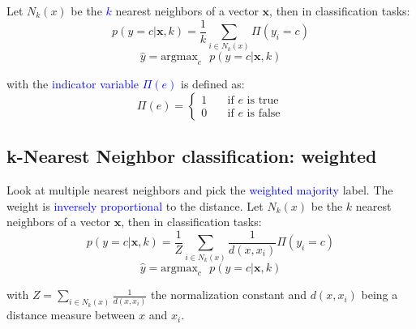 \documentclass[a4paper,10pt,twoside=true,DIV=10,headsepline,plainheadsepline]{scrartcl}
\begin{document}
Let $N_k (x)$ be the \textcolor{blue}{$k$} nearest neighbors of a vector $\mathbf{x}$, then in classification tasks:
		\begin{equation}
			p(y = c | \mathbf{x},k) = \frac{1}{k} \sum_{i \in N_k(x)} \Pi (y_i = c)
		\end{equation}
		\begin{equation}
			\hat{y} = \textrm{argmax}_c \textrm{ } p(y = c | \mathbf{x},k) 
		\end{equation}

	with the \textcolor{blue}{indicator variable $\Pi (e)$} is defined as:
		\begin{equation}
			\Pi (e) =
  			\begin{cases}
    				1  & \quad \text{if } e \text{ is true}\\
    				0  & \quad \text{if } e \text{ is false}
 			\end{cases}
		\end{equation}

	\subsection{k-Nearest Neighbor classification: weighted}
	Look at multiple nearest neighbors and pick the \textcolor{blue}{weighted majority} label. The weight is \textcolor{blue}{inversely proportional} to the distance. Let $N_k (x)$ be the $k$ nearest neighbors of a vector $\mathbf{x}$, then in classification tasks:
		\begin{equation}
			p(y = c | \mathbf{x},k) = \frac{1}{Z} \sum_{i \in N_k(x)} \frac{1}{d(x, x_i)} \Pi (y_i = c)
		\end{equation}
		\begin{equation}
			\hat{y} = \textrm{argmax}_c \textrm{ } p(y = c | \mathbf{x},k) 
		\end{equation}

	with $Z = \sum_{i \in N_k(x)} \frac{1}{d(x, x_i)}$ the normalization constant and $d(x,x_i)$ being a distance measure between $x$ and $x_i$. 
\end{document}
